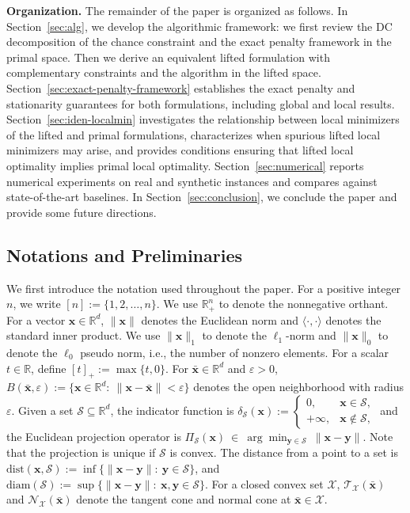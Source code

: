 \documentclass[11pt]{article}
\def\bs{\boldsymbol}
\def\Re{\mathbb{R}}
\def\diam{\mathrm{diam}}
\def\dist{\mathrm{dist}}
\def\N{\mathcal{N}}
\def\T{\mathcal{T}}
\def\X{\mathcal{X}}
\begin{document}
\noindent\textbf{Organization.}
The remainder of the paper is organized as follows. In Section~\ref{sec:alg}, we develop the algorithmic framework: we first review the DC decomposition of the chance constraint and the exact penalty framework in the primal space. Then we derive an equivalent lifted formulation with complementary constraints and the algorithm in the lifted space. Section~\ref{sec:exact-penalty-framework} establishes the exact penalty and stationarity guarantees for both formulations, including global and local results. Section~\ref{sec:iden-localmin} investigates the relationship between local minimizers of the lifted and primal formulations, characterizes when spurious lifted local minimizers may arise, and provides conditions ensuring that lifted local optimality implies primal local optimality. Section~\ref{sec:numerical} reports numerical experiments on real and synthetic instances and compares against state-of-the-art baselines. In Section~\ref{sec:conclusion}, we conclude the paper and provide some future directions.

\subsection{Notations and Preliminaries}
\label{sec:priliminaries}
We first introduce the notation used throughout the paper.
For a positive integer $n$, we write $[n]:=\{1,2,\ldots,n\}$. We use $\Re^n_+$ to denote the nonnegative orthant. For a vector $\bs{x}\in\Re^d$, $\|\bs{x}\|$ denotes the Euclidean norm and $\langle \cdot,\cdot\rangle$ denotes the standard inner product. We use $\|\bs{x}\|_1$ to denote the $\ell_1$-norm and $\|\bs{x}\|_0$ to denote the $\ell_0$ pseudo norm, i.e., the number of nonzero elements. For a scalar $t\in\Re$, define $[t]_+:=\max\{t,0\}$. For $\bar{\bs{x}}\in\Re^d$ and $\varepsilon>0$, $B(\bar{\bs{x}},\varepsilon):=\{\bs{x}\in\Re^d:\ \|\bs{x}-\bar{\bs{x}}\|<\varepsilon\}$ denotes the open neighborhood with radius $\varepsilon$. Given a set $\mathcal{S}\subseteq\Re^d$, the indicator function is
$ \delta_{\mathcal{S}}(\bs{x})
:= \begin{cases}
0, & \bs{x}\in\mathcal{S},\\
+\infty, & \bs{x}\notin\mathcal{S},
\end{cases}$
and the Euclidean projection operator is
$
\Pi_{\mathcal{S}}(\bs{x})\ \in\ \arg\min_{\bs{y}\in\mathcal{S}}\ \|\bs{x}-\bs{y}\|.
$
Note that the projection is unique if $\mathcal{S}$ is convex.
The distance from a point to a set is
$\dist(\bs{x},\mathcal{S}):=\inf\{\|\bs{x}-\bs{y}\|:\ \bs{y}\in\mathcal{S}\}$, and $\diam(\mathcal{S}):=\sup\{\|\bs{x}-\bs{y}\|:\ \bs{x},\bs{y}\in\mathcal{S}\}$. For a closed convex set $\X$, $\T_{\X}(\bar{\bs{x}})$ and $\N_{\X}(\bar{\bs{x}})$ denote the tangent cone and normal cone at $\bar{\bs{x}}\in\X$.
\end{document}
